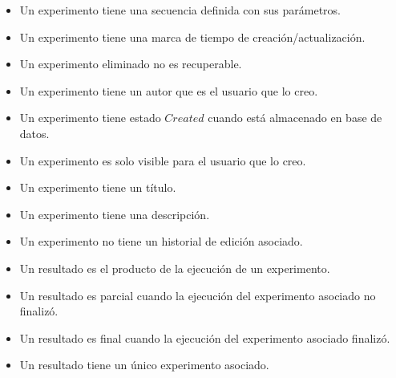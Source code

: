 \begin{itemize}
\item Un experimento tiene una secuencia definida con sus par\'ametros.
\item Un experimento tiene una marca de tiempo de creaci\'on/actualizaci\'on.
\item Un experimento eliminado no es recuperable.
\item Un experimento tiene un autor que es el usuario que lo creo.
\item Un experimento tiene estado $Created$ cuando est\'a almacenado en base de datos.
\item Un experimento es solo visible para el usuario que lo creo.
\item Un experimento tiene un t\'itulo.
\item Un experimento tiene una descripci\'on.
\item Un experimento no tiene un historial de edici\'on asociado.
\end{itemize}

\begin{itemize}
\item Un resultado es el producto de la ejecuci\'on de un experimento.
\item Un resultado es parcial cuando la ejecuci\'on del experimento asociado no finaliz\'o.
\item Un resultado es final cuando la ejecuci\'on del experimento asociado finaliz\'o.
\item Un resultado tiene un \'unico experimento asociado.
\end{itemize}

